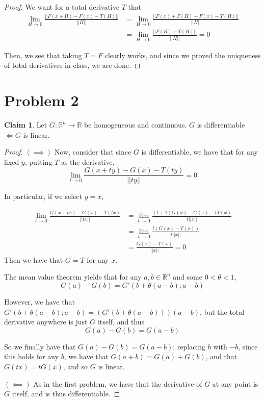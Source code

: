 \documentclass[12pt,letterpaper]{article}
\theoremstyle{definition}
\newtheorem*{claim}{Claim}
\newcommand{\R}{\mathbb{R}}
\begin{document}
\begin{proof}
  We want for a total derivative $T$ that
  \begin{align*}
    \lim_{H\rightarrow 0}\frac{||F(x + H) - F(x) - T(H)||}{||H||} &= \lim_{H\rightarrow 0}\frac{||F(x) + F(H) - F(x) - T(H)||}{||H||}\\
                                                              &= \lim_{H\rightarrow 0} \frac{||F(H) - T(H)||}{||H||} = 0
  \end{align*}

  Then, we see that taking $T = F$ clearly works, and since we proved the
  uniqueness of total derivatives in class, we are done.
\end{proof}

\section*{Problem 2}

\begin{claim}
  Let $G: \R^n \rightarrow \R$ be homogeneous and continuous. $G$ is
  differentiable $\iff G$ is linear.
\end{claim}

\begin{proof}
  $(\implies)$ Now, consider that since $G$ is differentiable, we have that for
  any fixed $y$, putting $T$ as the derivative,
  \[
    \lim_{t \rightarrow 0}\frac{G(x + ty) - G(x) - T(ty)}{||ty||} = 0
  \]

  In particular, if we select $y = x$,

  \begin{align*}
    \lim_{t \rightarrow 0}\frac{G(x + tx) - G(x) - T(tx)}{||tx||} &=  \lim_{t \rightarrow 0}\frac{(t+1)G(x) - G(x) - tT(x)}{t||x||} \\
                                                                  &= \lim_{t \rightarrow 0}\frac{t(G(x) -T(x))}{t||x||}\\
                                                                  &= \frac{G(x)-T(x)}{||x||} = 0
  \end{align*}
  Then we have that $G = T$ for any $x$.

  The mean value theorem yields that for any $a,b \in \R^n$ and some $0 < \theta < 1$,
  \[
    G(a) - G(b) = G'(b+\theta(a-b);a-b) 
  \]

  However, we have that $G'(b+\theta(a-b); a-b) = (G'(b+\theta(a-b)))(a-b)$, but
  the total derivative anywhere is just $G$ itself, and thus
  \[
    G(a) - G(b) = G(a-b)
  \]
  
  So we finally have that $G(a) - G(b) = G(a - b)$; replacing $b$ with $-b$,
  since this holds for any $b$, we have that $G(a + b) = G(a) + G(b)$, and that
  $G(tx) = tG(x)$, and so $G$ is linear.

  $(\impliedby)$ As in the first problem, we have that the derivative of $G$ at
  any point is $G$ itself, and is thus differentiable.
\end{proof}
\end{document}
